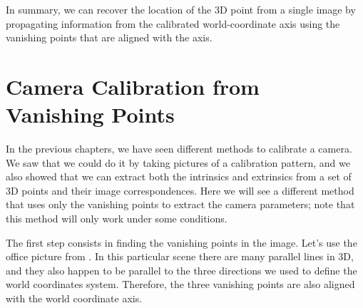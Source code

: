 In summary, we can recover the location of the 3D point from a single image by propagating information from the calibrated world-coordinate axis using the vanishing points that are aligned with the axis.  




\section{Camera Calibration from Vanishing Points}
In the previous chapters, we have seen different methods to calibrate a camera. We saw that we could do it by taking pictures of a calibration pattern, and we also showed that we can extract both the intrinsics and extrinsics from a set of  3D points and their image correspondences. Here we will see a different method that uses only the vanishing points to extract the camera parameters; note that this method will only work under some conditions.

The first step consists in finding the vanishing points in the image. Let's use the office picture from \fig{\ref{fig:vanishing_lines}}. In this particular scene there are many parallel lines in 3D, and they also happen to be parallel to the three directions we used to define the world coordinates system. Therefore, the three vanishing points are also aligned with the world coordinate axis. 



